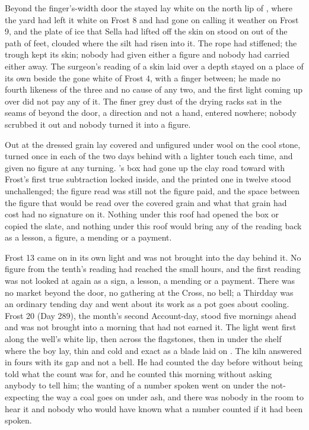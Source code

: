 Beyond the finger's-width door the stayed  lay white on the north lip of , where the yard had left it white on Frost 8 and had gone on calling it weather on Frost 9, and the plate of ice that Sella had lifted off the skin on  stood on  out of the path of feet, clouded where the silt had risen into it. The rope had stiffened; the trough kept its skin; nobody had given either a figure and nobody had carried either away. The surgeon's reading of a skin laid over a depth stayed on a place of its own beside the gone white of Frost 4, with a finger between; he made no fourth likeness of the three and no cause of any two, and the first light coming up over  did not pay any of it. The finer grey dust of the drying racks sat in the seams of  beyond the door, a direction and not a hand, entered nowhere; nobody scrubbed it out and nobody turned it into a figure.

Out at  the dressed grain lay covered and unfigured under wool on the cool stone, turned once in each of the two days behind with a lighter touch each time, and given no figure at any turning. 's box had gone up the clay road toward  with Frost's first true subtraction locked inside, and the printed one in twelve stood unchallenged; the figure read was still not the figure paid, and the space between the figure that would be read over the covered grain and what that grain had cost had no signature on it. Nothing under this roof had opened the box or copied the slate, and nothing under this roof would bring any of the reading back as a lesson, a figure, a mending or a payment.

Frost 13 came on in its own light and was not brought into the day behind it. No figure from the tenth's reading had reached the small hours, and the first reading was not looked at again as a sign, a lesson, a mending or a payment. There was no market beyond the door, no gathering at the Cross, no bell; a Thirdday was an ordinary tending day and went about its work as a pot goes about cooling. Frost 20 (Day 289), the month's second Account-day, stood five mornings ahead and was not brought into a morning that had not earned it. The light went first along the well's white lip, then across the flagstones, then in under the shelf where the boy lay, thin and cold and exact as a blade laid on . The kiln answered in fours with its gap and not a bell. He had counted the day before without being told what the count was for, and he counted this morning without asking anybody to tell him; the wanting of a number spoken went on under the not-expecting the way a coal goes on under ash, and there was nobody in the room to hear it and nobody who would have known what a number counted if it had been spoken.

